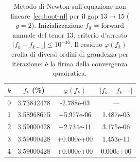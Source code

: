 \begin{table}[H]\centering\small
\caption{Metodo di Newton sull'equazione non lineare~\eqref{eq:boot-nl} per il gap $13\to15$ ($g=2$). Inizializzazione $f_0$ = forward annuale del tenor 13; criterio d'arresto $|f_k-f_{k-1}|\le 10^{-16}$. Il residuo $\varphi(f_k)$ crolla di diversi ordini di grandezza per iterazione: \`e la firma della convergenza quadratica.}
\label{tab:newton-esempio}\renewcommand{\arraystretch}{1.15}
\begin{tabular}{rccc}
\toprule
$k$ & $f_k$ (\%) & $\varphi(f_k)$ & $|f_k-f_{k-1}|$\\
\midrule
\rowcolor{rowtint}0 & 3.73842478 & -2.788e-03 & ---\\
1 & 3.58968675 & +5.977e-06 & 1.487e-03\\
\rowcolor{rowtint}2 & 3.59000428 & +2.734e-11 & 3.175e-06\\
3 & 3.59000428 & +0.000e+00 & 1.453e-11\\
\rowcolor{rowtint}4 & 3.59000428 & +0.000e+00 & 0.000e+00\\
\bottomrule
\end{tabular}
\end{table}
